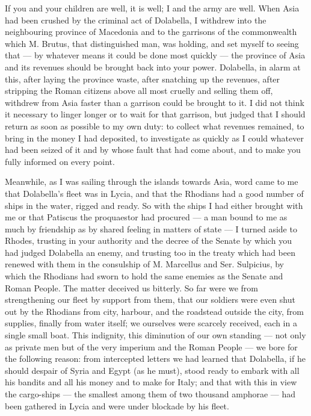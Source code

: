 

 If you and your children are well, it is well; I and the army are well. When Asia had been crushed by the criminal act of Dolabella, I withdrew into the neighbouring province of Macedonia and to the garrisons of the commonwealth which M. Brutus, that distinguished man, was holding, and set myself to seeing that --- by whatever means it could be done most quickly --- the province of Asia and its revenues should be brought back into your power. Dolabella, in alarm at this, after laying the province waste, after snatching up the revenues, after stripping the Roman citizens above all most cruelly and selling them off, withdrew from Asia faster than a garrison could be brought to it. I did not think it necessary to linger longer or to wait for that garrison, but judged that I should return as soon as possible to my own duty: to collect what revenues remained, to bring in the money I had deposited, to investigate as quickly as I could whatever had been seized of it and by whose fault that had come about, and to make you fully informed on every point.

 Meanwhile, as I was sailing through the islands towards Asia, word came to me that Dolabella's fleet was in Lycia, and that the Rhodians had a good number of ships in the water, rigged and ready. So with the ships I had either brought with me or that Patiscus the proquaestor had procured --- a man bound to me as much by friendship as by shared feeling in matters of state --- I turned aside to Rhodes, trusting in your authority and the decree of the Senate by which you had judged Dolabella an enemy, and trusting too in the treaty which had been renewed with them in the consulship of M. Marcellus and Ser. Sulpicius, by which the Rhodians had sworn to hold the same enemies as the Senate and Roman People. The matter deceived us bitterly. So far were we from strengthening our fleet by support from them, that our soldiers were even shut out by the Rhodians from city, harbour, and the roadstead outside the city, from supplies, finally from water itself; we ourselves were scarcely received, each in a single small boat. This indignity, this diminution of our own standing --- not only as private men but of the very imperium and the Roman People --- we bore for the following reason: from intercepted letters we had learned that Dolabella, if he should despair of Syria and Egypt (as he must), stood ready to embark with all his bandits and all his money and to make for Italy; and that with this in view the cargo-ships --- the smallest among them of two thousand amphorae --- had been gathered in Lycia and were under blockade by his fleet.


